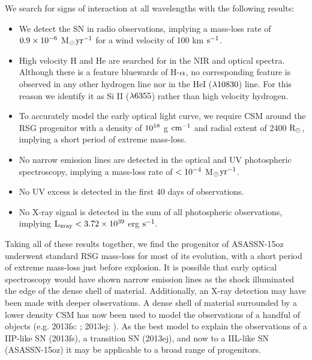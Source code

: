 \documentclass[a4paper,fleqn,usenatbib]{mnras}
\newcommand{\msunperiod}{M$\rm{_{\odot}}$}
\begin{document}
We search for signs of interaction at all wavelengths with the following results:
\begin{itemize}
\item We detect the SN in radio observations, implying a mass-loss rate of $\rm{0.9\times10^{-6}}$ \msunperiod $\rm{yr^{-1}}$ for a wind velocity of 100 km $\rm{s^{-1}}$.
\item High velocity H and He are searched for in the NIR and optical spectra. 
Although there is a feature bluewards of H-$\rm{\alpha}$, no corresponding feature is observed in any other hydrogen line nor in the HeI ($\rm{\lambda 10830}$) line. 
For this reason we identify it as Si II ($\rm{\lambda 6355}$) rather than high velocity hydrogen.
\item To accurately model the early optical light curve, we require CSM around the RSG progenitor with a density of $\rm{10^{18}}$ g $\rm{cm^{-1}}$ and radial extent of 2400 $\rm{R_{\odot}}$, implying a short period of extreme mass-loss.
\item No narrow emission lines are detected in the optical and UV photospheric spectroscopy, implying a mass-loss rate of $\rm{< 10^{-4}}$ \msunperiod $\rm{yr^{-1}}$.
\item No UV excess is detected in the first 40 days of observations.
\item No X-ray signal is detected in the sum of all photospheric observations, implying $\rm{L_{xray}<3.72\times10^{39}}$ erg $\rm{s^{-1}}$.
\end{itemize}
Taking all of these results together, we find the progenitor of ASASSN-15oz underwent standard RSG mass-loss for most of its evolution, with a short period of extreme mass-loss just before explosion. 
It is possible that early optical spectroscopy would have shown narrow emission lines as the shock illuminated the edge of the dense shell of material.
Additionally, an X-ray detection may have been made with deeper observations. 
A dense shell of material surrounded by a lower density CSM has now been used to model the observations of a handful of objects (e.g. 2013fs: \citealt{2017yaron}; 2013ej: \citealt{2018morozova2}).
As the best model to explain the observations of a IIP-like SN (2013fs), a transition SN (2013ej), and now to a IIL-like SN (ASASSN-15oz) it may be applicable to a broad range of progenitors.

\end{document}
